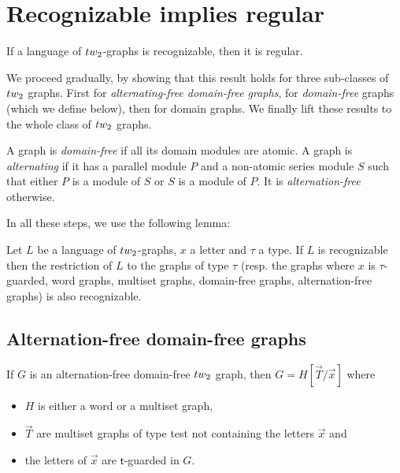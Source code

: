 \section{Recognizable implies regular}\label{sec:rec->reg}


\begin{theorem}\label{thm:Rec->Reg}
If a language of $\TWT$-graphs is recognizable, then it is regular.
\end{theorem}

We proceed gradually, by showing that this result holds for three sub-classes of $\TWT$ graphs. First for \emph{alternating-free domain-free graphs}, for \emph{domain-free} graphs (which we define below), then for domain graphs. We finally lift these results to the whole class of $\TWT$ graphs.  

\begin{definition}
A graph is \emph{domain-free} if all its domain modules are atomic. A graph is \emph{alternating} if it has a parallel module $P$ and a non-atomic series module $S$ such that either $P$ is a module of $S$ or $S$ is a module of $P$. It is \emph{alternation-free}  otherwise.  
\end{definition}

 In all these steps, we use the following lemma:
\begin{lemma}\label{lem:imposing-type-is-recognizable}
Let $L$ be a language of $\TWT$-graphs, $x$ a letter and $\tau$ a type. If $L$ is recognizable then the restriction of $L$ to the graphs of type $\tau$ (resp.  the graphs where $x$ is $\tau$-guarded, word graphs, multiset graphs, domain-free graphs, alternation-free graphs) is also recognizable.
\end{lemma}
%

\subsection{Alternation-free domain-free graphs}

\begin{lemma}\label{lem:alt-free-dom-free-description}
If $G$ is an alternation-free domain-free $\TWT$ graph, then $G=H[\vec{T}/\vec{x}]$ where 
\begin{itemize}
\item $H$ is either a word or a multiset graph,
\item $\vec{T}$ are multiset graphs of type test not containing the letters $\vec{x}$ and 
\item  the  letters of $\vec{x}$ are $\mathsf{t}$-guarded in $G$.
\end{itemize}  
\end{lemma}


